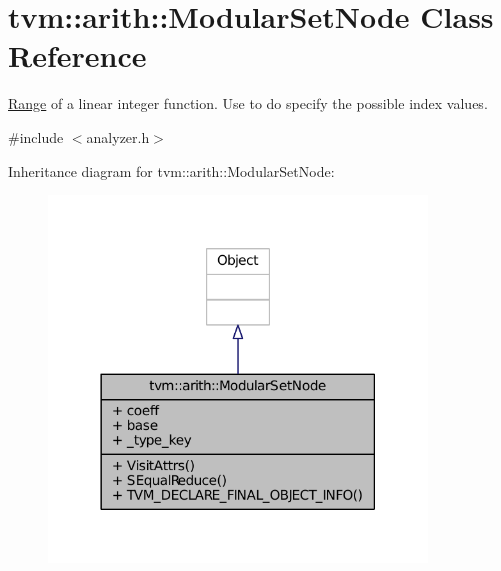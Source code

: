 \hypertarget{classtvm_1_1arith_1_1ModularSetNode}{}\section{tvm\+:\+:arith\+:\+:Modular\+Set\+Node Class Reference}
\label{classtvm_1_1arith_1_1ModularSetNode}


\hyperlink{classtvm_1_1Range}{Range} of a linear integer function. Use to do specify the possible index values.  




{\ttfamily \#include $<$analyzer.\+h$>$}



Inheritance diagram for tvm\+:\+:arith\+:\+:Modular\+Set\+Node\+:
\nopagebreak
\begin{figure}[H]
\begin{center}
\leavevmode
\includegraphics[width=285pt]{classtvm_1_1arith_1_1ModularSetNode__inherit__graph}
\end{center}
\end{figure}



